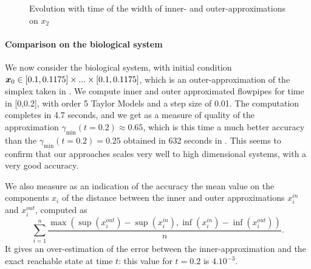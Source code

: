 \documentclass{sig-alternate-05-2015}
\begin{document}
\begin{figure}[htbp]
\begin{center}
\end{center}
\caption{Evolution with time of the width of inner- and outer-approximations on $x_2$ \label{ex:width_sriram_bruss2} }
\end{figure}


\paragraph{Comparison on the biological system}
We now consider the biological system, with initial condition $\x_0 \in [0.1,0.1175] \times...\times [0.1,0.1175]$, which is an outer-approximation
of the simplex taken in  \cite{Underapproxflowpipes}. We compute inner and outer approximated flowpipes for time in [0,0.2], 
with order 5 Taylor Models and a step size of 0.01. The computation completes in 4.7 seconds, and we get as a measure of quality of the approximation 
$\gamma_{\min}(t=0.2) \approx 0.65$, which is this time a much better accuracy than the $\gamma_{\min}(t=0.2) = 0.25$ obtained in 632 seconds in  \cite{Underapproxflowpipes}. 
This seems to confirm that our approaches scales very well to high dimensional systems, with a very good accuracy. 

We also measure as an indication of the accuracy the mean value on the components $x_i$ of the distance between the inner and outer approximations $x_i^{in}$ and $x_i^{out}$,
computed as $$\sum_{i=1}^n \frac{\max(\sup(x_i^{out})-\sup(x_i^{in}),\inf(x_i^{in})- \inf(x_i^{out}))}{n}.$$
It gives an over-estimation of the error between the inner-approximation and the exact reachable state at time $t$: this value for $t=0.2$ is $4.10^{-3}$.



\end{document}
